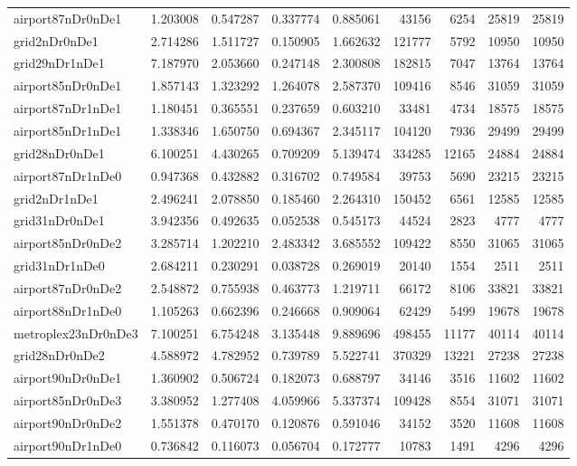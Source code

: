 \begin{longtable}{|l|r|r|r|r|r|r|r|r|}
airport87nDr0nDe1 & 1.203008 & 0.547287 & 0.337774 & 0.885061 & 43156 & 6254 & 25819 & 25819 \\
grid2nDr0nDe1 & 2.714286 & 1.511727 & 0.150905 & 1.662632 & 121777 & 5792 & 10950 & 10950 \\
grid29nDr1nDe1 & 7.187970 & 2.053660 & 0.247148 & 2.300808 & 182815 & 7047 & 13764 & 13764 \\
airport85nDr0nDe1 & 1.857143 & 1.323292 & 1.264078 & 2.587370 & 109416 & 8546 & 31059 & 31059 \\
airport87nDr1nDe1 & 1.180451 & 0.365551 & 0.237659 & 0.603210 & 33481 & 4734 & 18575 & 18575 \\
airport85nDr1nDe1 & 1.338346 & 1.650750 & 0.694367 & 2.345117 & 104120 & 7936 & 29499 & 29499 \\
grid28nDr0nDe1 & 6.100251 & 4.430265 & 0.709209 & 5.139474 & 334285 & 12165 & 24884 & 24884 \\
airport87nDr1nDe0 & 0.947368 & 0.432882 & 0.316702 & 0.749584 & 39753 & 5690 & 23215 & 23215 \\
grid2nDr1nDe1 & 2.496241 & 2.078850 & 0.185460 & 2.264310 & 150452 & 6561 & 12585 & 12585 \\
grid31nDr0nDe1 & 3.942356 & 0.492635 & 0.052538 & 0.545173 & 44524 & 2823 & 4777 & 4777 \\
airport85nDr0nDe2 & 3.285714 & 1.202210 & 2.483342 & 3.685552 & 109422 & 8550 & 31065 & 31065 \\
grid31nDr1nDe0 & 2.684211 & 0.230291 & 0.038728 & 0.269019 & 20140 & 1554 & 2511 & 2511 \\
airport87nDr0nDe2 & 2.548872 & 0.755938 & 0.463773 & 1.219711 & 66172 & 8106 & 33821 & 33821 \\
airport88nDr1nDe0 & 1.105263 & 0.662396 & 0.246668 & 0.909064 & 62429 & 5499 & 19678 & 19678 \\
metroplex23nDr0nDe3 & 7.100251 & 6.754248 & 3.135448 & 9.889696 & 498455 & 11177 & 40114 & 40114 \\
grid28nDr0nDe2 & 4.588972 & 4.782952 & 0.739789 & 5.522741 & 370329 & 13221 & 27238 & 27238 \\
airport90nDr0nDe1 & 1.360902 & 0.506724 & 0.182073 & 0.688797 & 34146 & 3516 & 11602 & 11602 \\
airport85nDr0nDe3 & 3.380952 & 1.277408 & 4.059966 & 5.337374 & 109428 & 8554 & 31071 & 31071 \\
airport90nDr0nDe2 & 1.551378 & 0.470170 & 0.120876 & 0.591046 & 34152 & 3520 & 11608 & 11608 \\
airport90nDr1nDe0 & 0.736842 & 0.116073 & 0.056704 & 0.172777 & 10783 & 1491 & 4296 & 4296 \\

\end{longtable}
